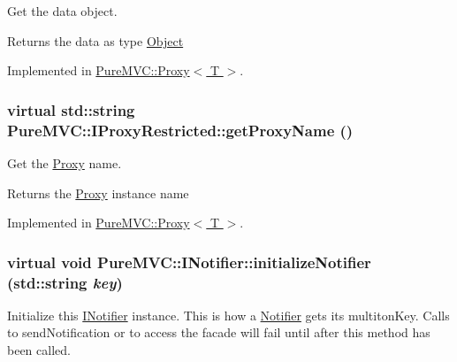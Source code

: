 Get the data object. \begin{DoxyReturn}{Returns}
the data as type \hyperlink{class_pure_m_v_c_1_1_object}{Object} 
\end{DoxyReturn}


Implemented in \hyperlink{class_pure_m_v_c_1_1_proxy_a717242b7e7053d768d08ac5972ab8688}{PureMVC::Proxy$<$ T $>$}.\hypertarget{class_pure_m_v_c_1_1_i_proxy_restricted_ae52c8f9de4c2f4a4b90e97006e0b08f9}{
\subsubsection[{getProxyName}]{\setlength{\rightskip}{0pt plus 5cm}virtual std::string PureMVC::IProxyRestricted::getProxyName ()}}
\label{class_pure_m_v_c_1_1_i_proxy_restricted_ae52c8f9de4c2f4a4b90e97006e0b08f9}


Get the \hyperlink{class_pure_m_v_c_1_1_proxy}{Proxy} name. \begin{DoxyReturn}{Returns}
the \hyperlink{class_pure_m_v_c_1_1_proxy}{Proxy} instance name 
\end{DoxyReturn}


Implemented in \hyperlink{class_pure_m_v_c_1_1_proxy_a1aad6dd9244cd07361afb0bb5829b09d}{PureMVC::Proxy$<$ T $>$}.\hypertarget{class_pure_m_v_c_1_1_i_notifier_a28d7dbbe0726d4d52080546c5d79b232}{
\subsubsection[{initializeNotifier}]{\setlength{\rightskip}{0pt plus 5cm}virtual void PureMVC::INotifier::initializeNotifier (std::string {\em key})}}
\label{class_pure_m_v_c_1_1_i_notifier_a28d7dbbe0726d4d52080546c5d79b232}


Initialize this \hyperlink{class_pure_m_v_c_1_1_i_notifier}{INotifier} instance. This is how a \hyperlink{class_pure_m_v_c_1_1_notifier}{Notifier} gets its multitonKey. Calls to sendNotification or to access the facade will fail until after this method has been called.


